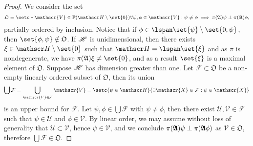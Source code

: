 \begin{proof}
    We consider the set
    \begin{equation*}
        \mathfrak{O} = \setc*{\mathscr{V} \in \mathbb{P}(\hilbert\setminus\set{0})}{\forall \psi,\phi \in \mathscr{V} : \psi \neq \phi \implies \pi(\algebra{A})\psi \perp \pi(\algebra{A})\phi},
    \end{equation*}
    partially ordered by inclusion. Notice that if \(\phi \in \lspan\set{\psi}\setminus \set{0,\psi}\), then \(\set{\phi,\psi} \notin \mathfrak{O}\). If \(\mathscr{H}\) is unidimensional, then there exists \(\xi \in \hilbert\setminus\set{0}\) such that \(\hilbert = \lspan\set{\xi}\) and as \(\pi\) is nondegenerate, we have \(\pi(\algebra{A})\xi \neq \set{0}\), and as a result \(\set{\xi}\) is a maximal element of \(\mathfrak{O}\). Suppose \(\mathscr{H}\) has dimension greater than one. Let \(\mathcal{F} \subset \mathfrak{O}\) be a non-empty linearly ordered subset of \(\mathfrak{O}\), then its union 
    \begin{equation*}
        \bigcup \mathcal{F} = \bigcup_{\mathscr{V} \in \mathcal{F}} \mathscr{V} = \setc{\psi \in \hilbert}{\exists \mathscr{X} \in \mathcal{F} : \psi \in \mathscr{X}}
    \end{equation*}
    is an upper bound for \(\mathcal{F}\). Let \(\psi, \phi \in \bigcup \mathcal{F}\) with \(\psi \neq \phi\), then there exist \(\mathscr{U},\mathscr{V} \in \mathcal{F}\) such that \(\psi \in \mathscr{U}\) and \(\phi \in \mathscr{V}\). By linear order, we may assume without loss of generality that \(\mathscr{U} \subset \mathscr{V}\), hence \(\psi \in \mathscr{V}\), and we conclude \(\pi(\mathfrak{A})\psi \perp \pi(\mathfrak{A}\phi)\) as \(\mathscr{V} \in \mathfrak{O}\), therefore \(\bigcup \mathcal{F} \in \mathfrak{O}\). 


\end{proof}
